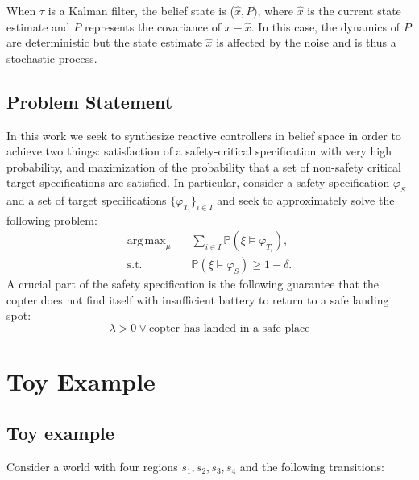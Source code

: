 \documentclass[conference]{IEEEtran}
\DeclareMathOperator*{\argmax}{arg\,max}
\begin{document}
When $\tau$ is a Kalman filter, the belief state is ($\hat x, P)$, where $\hat x$ is the current state estimate and $P$ represents the covariance of $x - \hat x$. In this case, the dynamics of $P$ are deterministic but the state estimate $\hat x$ is affected by the noise and is thus a stochastic process.


\subsection{Problem Statement}

In this work we seek to synthesize reactive controllers in belief space in order to achieve two things: satisfaction of a safety-critical specification with very high probability, and maximization of the probability that a set of non-safety critical target specifications are satisfied. In particular, consider a safety specification $\varphi_S$ and a set of target specifications $\{ \varphi_{T_i} \}_{i \in I}$ and seek to approximately solve the following problem:
\begin{equation}
\begin{aligned}
  \argmax_{\mu} & \quad  \sum_{i \in I} \mathbb{P} \left( \xi \models \varphi_{T_i} \right), \\ 
  \text{s.t.} &\quad   \mathbb{P} \left( \xi \models \varphi_S \right) \geq 1 - \delta.
\end{aligned}
\end{equation}
A crucial part of the safety specification is the following guarantee that the copter does not find itself with insufficient battery to return to a safe landing spot:
\begin{equation}
  \lambda > 0 \lor  \text{copter has landed in a safe place}
\end{equation}

\section{Toy Example}

\subsection{Toy example}

Consider a world with four regions $s_1, s_2, s_3, s_4$ and the following transitions:

\begin{center}
\end{center}
\end{document}
